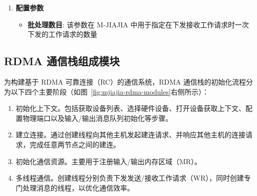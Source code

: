 {\begin{enumerate}[label=\arabic*., leftmargin=1em, align=left]
        \item \textbf{配置参数}
              \begin{itemize}[leftmargin=*, nosep]
                  \item \textbf{批处理数目}: 该参数在 M-JIAJIA 中用于指定在下发接收工作请求时一次下发的工作请求的数量
              \end{itemize}
    \end{enumerate}








    \subsection{RDMA 通信栈组成模块}

    为构建基于 RDMA 可靠连接（RC）的通信系统，RDMA 通信栈的初始化流程分为以下四个主要阶段（如图~\ref{fig:mjiajia-rdma-modules}右侧所示）：
    \begin{enumerate}[label=\arabic*.]
        \item 初始化上下文。包括获取设备列表、选择硬件设备、打开设备获取上下文、配置物理端口以及输入/输出消息队列初始化等步骤。
        \item 建立连接。通过创建线程向其他主机发起建连请求、并响应其他主机的连接请求，完成任意两节点之间的建连。
        \item 初始化通信资源。主要用于注册输入/输出内存区域（MR）。
        \item 多线程通信。创建线程分别负责下发发送/接收工作请求（WR），同时创建专门处理消息的线程，以优化通信效率。
    \end{enumerate}

}
